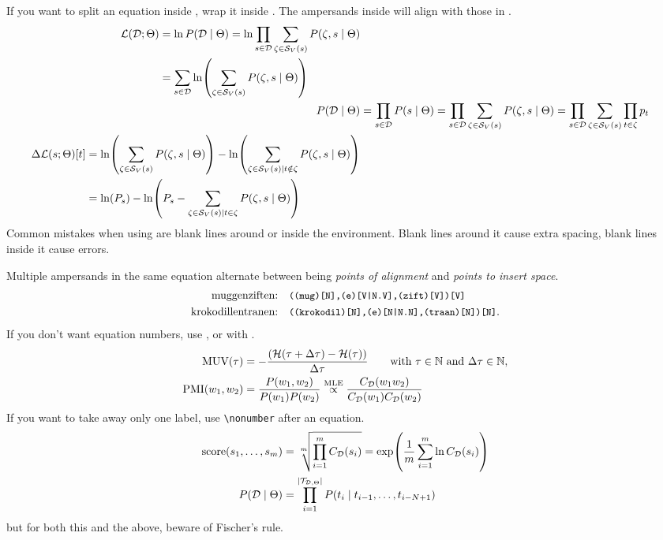 If you want to split an equation inside , wrap it inside . The ampersands inside  will align with those in .
\begin{align}
	\begin{split}
		\Li(\D;\Theta) &= \ln P(\D \mid \Theta) = \ln \prod_{s\in\D} \sum_{\zeta\in \mathcal S_V(s)} P(\zeta,s\mid \Theta) \\
		&= \sum_{s\in\D} \ln\left(\sum_{\zeta\in \mathcal S_V(s)} P(\zeta,s\mid \Theta)\right) 
	\end{split} \\
	P(\D \mid \Theta) &= \prod_{s\in \D} P(s \mid \Theta) = \prod_{s\in\D} \sum_{\zeta\in \mathcal S_V(s)} P(\zeta,s\mid \Theta) = \prod_{s\in\D} \sum_{\zeta\in \mathcal S_V(s)} \prod_{t\in \zeta} p_t \label{eq:kudo} \\
	\begin{split}
		\Delta\mathcal L(s;\Theta)[t] &= \ln\left(\sum_{\zeta\in \mathcal S_V(s)} P(\zeta,s\mid \Theta)\right) - \ln\left(\sum_{\zeta\in \mathcal S_V(s) \mid t\notin \zeta} P(\zeta,s\mid \Theta)\right) \\ 
		&= \ln(P_s) - \ln\left(P_s - \sum_{\zeta\in \mathcal S_V(s) \mid t\in \zeta} P(\zeta,s\mid \Theta)\right)
	\end{split}
\end{align}
Common mistakes when using  are blank lines around or inside the environment. Blank lines around it cause extra spacing, blank lines inside it cause errors.

Multiple ampersands in the same equation alternate between being \emph{points of alignment} and \emph{points to insert space}.
\begin{align}
	\text{muggenziften:}& & &\texttt{\small ((mug)[N],(e)[V|N.V],(zift)[V])[V]} \\
	\text{krokodillentranen:}& & &\texttt{\small((krokodil)[N],(e)[N|N.N],(traan)[N])[N]}.
\end{align}
If you don't want equation numbers, use , or  with .
\begin{align*}
	\text{MUV}(\tau) &= -\frac{(\mathcal H(\tau + \Delta\tau) - \mathcal H(\tau))}{\Delta\tau} \qquad\text{with $\tau\in\mathbb{N}$ and $\Delta\tau\in\mathbb{N}$}, \\
	\text{PMI}(w_1,w_2) &= \frac{P(w_1,w_2)}{P(w_1)P(w_2)} \stackrel{\text{MLE}}{\propto} \frac{C_{\mathcal{D}}(w_1w_2)}{C_{\mathcal{D}}(w_1)C_{\mathcal{D}}(w_2)}
\end{align*}
If you want to take away only one label, use \verb|\nonumber| after an equation.
\begin{align}
	\text{score}(s_1,\hdots,s_m) &= \sqrt[m]{\prod_{i=1}^m C_{\D}(s_i)} = \exp\left(\frac{1}{m}\sum_{i=1}^{m}\ln C_{\D}(s_i)\right) \label{eq:knk} \nonumber \\
	P(\D \mid \Theta) &= \prod_{i=1}^{|\T_{\D,\Theta}|} P(t_i\mid t_{i-1},\hdots,t_{i-N+1})
\end{align}
but for both this and the above, beware of Fischer's rule.

